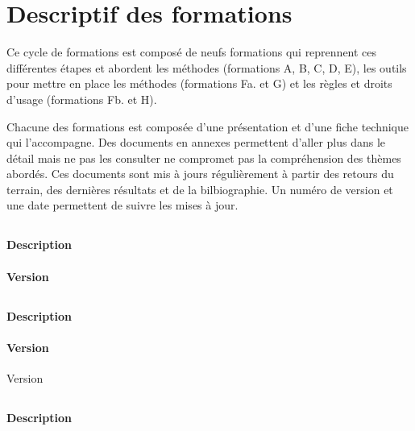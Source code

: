 \section{Descriptif des formations}

Ce cycle de formations est composé de neufs formations qui reprennent ces différentes étapes et abordent les méthodes (formations A, B, C, D, E), les outils pour mettre en place les méthodes (formations Fa. et G) et les règles et droits d'usage (formations Fb. et H).

Chacune des formations est composée d'une présentation et d'une fiche technique qui l'accompagne. 
Des documents en annexes permettent d'aller plus dans le détail mais ne pas les consulter ne compromet pas la compréhension des thèmes abordés.
Ces documents sont mis à jours régulièrement à partir des retours du terrain, des dernières résultats et de la bilbiographie.
Un numéro de version et une date permettent de suivre les mises à jour.

\subsection{\formationA}
\paragraph{Description} \descriptifFA
\paragraph{Version} %

\subsection{\formationB}
\paragraph{Description} \descriptifFB
\paragraph{Version} Version %


\subsection{\formationC}
\paragraph{Description} \descriptifFC



